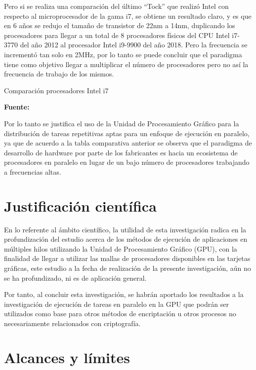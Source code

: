 \documentclass[../main/main.tex]{subfiles}
\begin{document}
  Pero si se realiza una comparación del último ``Tock'' que realizó Intel con respecto al microprocesador de la gama i7, se obtiene un resultado claro, y es que en 6 años se redujo el tamaño de transistor de 22nm a 14nm, duplicando los procesadores para llegar a un total de 8 procesadores físicos del CPU Intel i7-3770 del año 2012 al procesador Intel i9-9900 del año 2018. Pero la frecuencia se incrementó tan solo en 2MHz, por lo tanto se puede concluir que el paradigma tiene como objetivo llegar a multiplicar el número de procesadores pero no así la frecuencia de trabajo de los mismos.

  \begin{table}[H]
    \centering
    \caption{Comparación procesadores Intel i7}
    
    \caption*{\textbf{Fuente:} \href{https://cpu.userbenchmark.com/Compare/Intel-Core-i9-9900K-vs-Intel-Core-i7-3770/4028vs1979}{\cite{web:i9_vs_i7}}}
  \end{table}

  Por lo tanto se justifica el uso de la Unidad de Procesamiento Gráfico para la distribución de tareas repetitivas aptas para un enfoque de ejecución en paralelo, ya que de acuerdo a la tabla comparativa anterior se observa que el paradigma de desarrollo de hardware por parte de los fabricantes es hacia un ecosistema de procesadores en paralelo en lugar de un bajo número de procesadores trabajando a frecuencias altas.

  \section{Justificación científica}

  En lo referente al ámbito científico, la utilidad de esta investigación radica en la profundización del estudio acerca de los métodos de ejecución de aplicaciones en múltiples hilos utilizando la Unidad de Procesamiento Gráfico (GPU), con la finalidad de llegar a utilizar las mallas de procesadores disponibles en las tarjetas gráficas, este estudio a la fecha de realización de la presente investigación, aún no se ha profundizado, ni es de aplicación general.

  Por tanto, al concluir esta investigación, se habrán aportado los resultados a la investigación de ejecución de tareas en paralelo en la GPU que podrán ser utilizados como base para otros métodos de encriptación u otros procesos no necesariamente relacionados con criptografía.

  \section{Alcances y límites} \label{limites_alcances}
\end{document}
